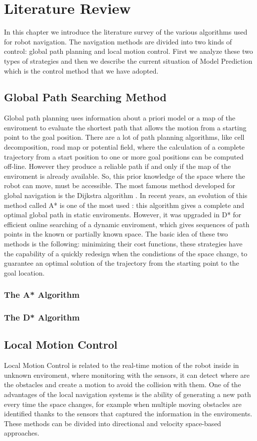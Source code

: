 \chapter{Literature Review}
In this chapter we introduce the literature survey of the various algorithms used for robot navigation. The navigation methods are divided into two kinds of control: global path planning and local motion control. First we analyze these two types of strategies and then we describe the current situation of Model Prediction which is the control method that we have adopted.
\section{Global Path Searching Method}
Global path planning uses information about a priori model or a map of the enviroment to evaluate the shortest path that allows the motion from a starting point to the goal position.
There are a lot of path planning algorithms, like cell decomposition, road map or potential field, where the calculation of a complete trajectory from a start position to one or more goal positions can be computed off-line. However they produce a reliable path if and only if the map of the enviroment is already available. So, this prior knowledge of the space where the robot can move, must be accessible.
The most famous method developed for global navigation is the Dijkstra algorithm \cite{Dijkstra:1959}. In recent years, an evolution of this method called A* is one of the most used \cite{Hart:1968}: this algorithm gives a complete and optimal global path in static enviroments. However, it was upgraded in D* \cite{Stentz93optimaland} for efficient online searching of a dynamic enviroment, which gives sequences of path points in the known or partially known space. The basic idea of these two methods is the following: minimizing their cost functions, these strategies have the capability of a quickly  redesign when the condistions of the space change, to guarantee an optimal solution of the trajectory from the starting point to the goal location.

\subsection{The A* Algorithm}
\subsection{The D* Algorithm}
\section{Local Motion Control}
Local Motion Control is related to the real-time motion of the robot inside in unknown enviroment, where monitoring with the sensors, it can detect where are the obstacles and create a motion to avoid the collision with them. One of the advantages of the local navigation systems is the ability of generating a new path every time the space changes, for example when multiple moving obstacles are identified thanks to the sensors that captured the information in the enviroments. These methods can be divided into directional and velocity space-based approaches.

